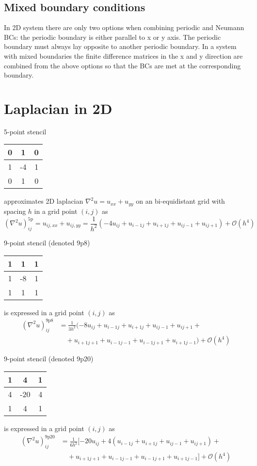 \subsection{Mixed boundary conditions}
In 2D system there are only two options when combining periodic and Neumann BCs: the periodic boundary is either parallel to x or y axis. The periodic boundary must always lay opposite to another periodic boundary. In a system with mixed boundaries the finite difference matrices in the x and y direction are combined from the above options so that the BCs are met at the corresponding boundary. 

\section{Laplacian in 2D}
5-point stencil 
\begin{tabular}{c|c|c}
	0&1&0  \\\hline
	1&-4&1 \\\hline
	0&1&0
\end{tabular} 
approximates 2D laplacian $\nabla^2 u = u_{xx}+u_{yy}$ on an bi-equidistant grid with spacing $h$ in a grid point $(i,j)$ as
\begin{equation}
	(\nabla^2u)_{ij}^{\mathrm{5p}} = u_{ij,xx} + u_{ij,yy} = \frac{1}{h^2}(-4u_{ij} + u_{i-1j}+ u_{i+1j}+ u_{ij-1}+ u_{ij+1}) + \mathcal{O}(h^4)
\end{equation}

9-point stencil (denoted 9p8)
\begin{tabular}{c|c|c}
	1&1&1  \\\hline
	1&-8&1 \\\hline
	1&1&1
\end{tabular} 
is expressed in a grid point $(i,j)$ as
\begin{equation}
	\begin{split}
		(\nabla^2u)_{ij}^{\mathrm{9p8}} &=  \frac{1}{3h^2}(-8u_{ij} + u_{i-1j}+ u_{i+1j}+ u_{ij-1}+ u_{ij+1} +\\
		&\quad+ u_{i+1j+1}+u_{i-1j-1}+u_{i-1j+1}+u_{i+1j-1}) + \mathcal{O}(h^4)
	\end{split}
\end{equation}

9-point stencil (denoted 9p20)
\begin{tabular}{c|c|c}
	1&4&1  \\\hline
	4&-20&4 \\\hline
	1&4&1
\end{tabular} 
is expressed in a grid point $(i,j)$ as
\begin{equation}
	\begin{split}
		(\nabla^2u)_{ij}^{\mathrm{9p20}} &=  \frac{1}{6h^2}[-20u_{ij} + 4(u_{i-1j}+ u_{i+1j}+ u_{ij-1}+ u_{ij+1}) +\\
		&\quad+ u_{i+1j+1}+u_{i-1j-1}+u_{i-1j+1}+u_{i+1j-1}] + \mathcal{O}(h^4)
	\end{split}
\end{equation}

